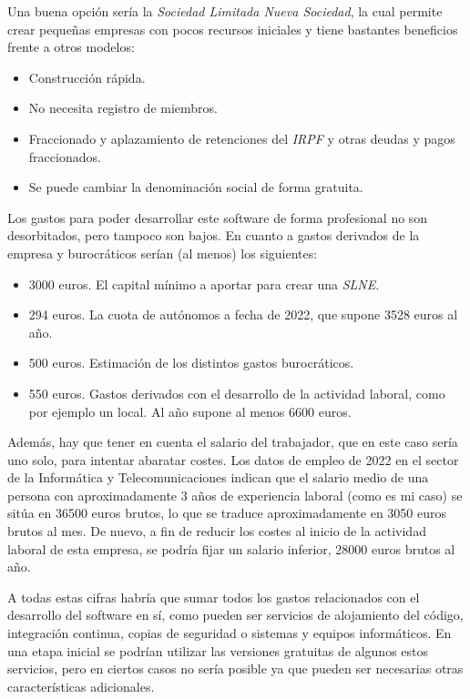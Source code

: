 Una buena opción sería la \textit {Sociedad Limitada Nueva Sociedad}, la cual permite crear pequeñas empresas con pocos recursos iniciales y tiene bastantes beneficios frente a otros modelos:

\begin{itemize}
	\item Construcción rápida.
	\item No necesita registro de miembros.
	\item Fraccionado y aplazamiento de retenciones del \textit{IRPF} y otras deudas y pagos fraccionados.
	\item Se puede cambiar la denominación social de forma gratuita.
\end{itemize}

Los gastos para poder desarrollar este software de forma profesional no son desorbitados, pero tampoco son bajos. En cuanto a gastos derivados de la empresa y burocráticos serían (al menos) los siguientes:

\begin{itemize}
	\item 3000 euros. El capital mínimo a aportar para crear una \textit{SLNE}.
	\item 294 euros. La cuota de autónomos a fecha de 2022, que supone 3528 euros al año.
	\item 500 euros. Estimación de los distintos gastos burocráticos.
	\item 550 euros. Gastos derivados con el desarrollo de la actividad laboral, como por ejemplo un local. Al año supone al menos 6600 euros.
\end{itemize}

Además, hay que tener en cuenta el salario del trabajador, que en este caso sería uno solo, para intentar abaratar costes. Los datos de empleo de 2022 en el sector de la Informática y Telecomunicaciones indican que el salario medio de una persona con aproximadamente 3 años de experiencia laboral (como es mi caso) se sitúa en 36500 euros brutos, lo que se traduce aproximadamente en 3050 euros brutos al mes. De nuevo, a fin de reducir los costes al inicio de la actividad laboral de esta empresa, se podría fijar un salario inferior, 28000 euros brutos al año.

A todas estas cifras habría que sumar todos los gastos relacionados con el desarrollo del software en sí, como pueden ser servicios de alojamiento del código, integración continua, copias de seguridad o sistemas y equipos informáticos. En una etapa inicial se podrían utilizar las versiones gratuitas de algunos estos servicios, pero en ciertos casos no sería posible ya que pueden ser necesarias otras características adicionales.


